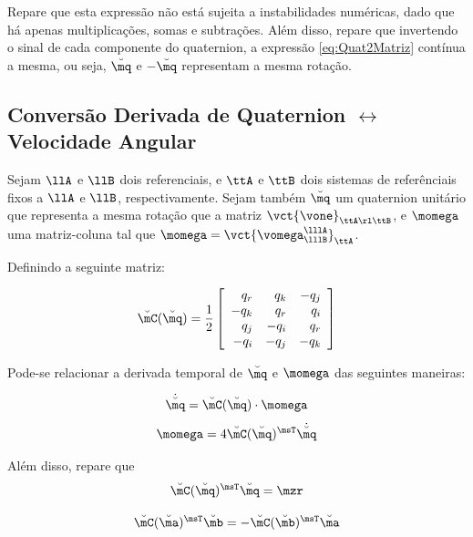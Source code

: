 \documentclass[]{politex}
\begin{document}
Repare que esta expressão não está sujeita a instabilidades numéricas, dado que há apenas multiplicações, somas e subtrações. Além disso, repare que invertendo o sinal de cada componente do quaternion, a expressão \eqref{eq:Quat2Matriz} contínua a mesma, ou seja, $\breve{\mq}$ e $-\breve{\mq}$ representam a mesma rotação. 

\subsection{Conversão Derivada de Quaternion $\leftrightarrow$ Velocidade Angular} \label{subsec:DerivadaQuat}

Sejam $\llA$ e $\llB$ dois referenciais, e $\ttA$ e $\ttB$ dois sistemas de referênciais fixos a $\llA$ e $\llB$, respectivamente. Sejam também $\breve{\mq}$ um quaternion unitário que representa a mesma rotação que a matriz $\vct{\vone}_{\ttA \rl \ttB}$, e $\momega$ uma matriz-coluna tal que $\momega = \vct{\vomega_{\lllB}^{\lllA}}_{\ttA}$.

Definindo a seguinte matriz:

\begin{equation}
\breve{\mC}(\breve{\mq}) =
\frac{1}{2}
\begin{bmatrix}
\begin{array}{rrr}
q_r & q_k & -q_j \\
-q_k & q_r & q_i\\
q_j & -q_i & q_r\\
-q_i & -q_j & - q_k
\end{array}
\end{bmatrix}
\end{equation}

Pode-se relacionar a derivada temporal de $\breve{\mq}$ e $\momega$ das seguintes maneiras:

\begin{equation} \label{eq:dQuat2w}
\dot{\breve{\mq}} = \breve{\mC}(\breve{\mq}) \cdot \momega
\end{equation}
\begin{equation}
\momega = 4 \breve{\mC} (\breve{\mq})^\msT \dot{\breve{\mq}}
\end{equation}

Além disso, repare que 
\begin{equation} \label{eq:CQuatZero}
\breve{\mC} (\breve{\mq})^\msT \breve{\mq} = \mzr
\end{equation}

\begin{equation}
\breve{\mC} (\breve{\ma})^\msT \breve{\mb} = -\breve{\mC} (\breve{\mb})^\msT \breve{\ma}
\end{equation}
\end{document}
